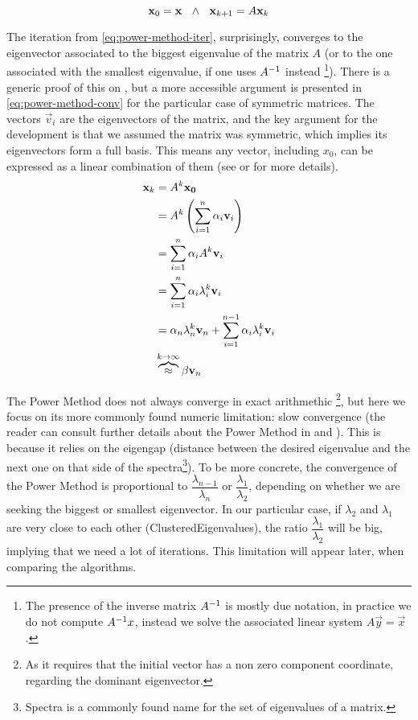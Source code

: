 \begin{equation}
  \label{eq:power-method-iter}
    \vec{x}_0 = \vec{x} \ds{\ds{\land}}
    \vec{x}_{k+1} = A\vec{x}_k  
\end{equation}
\joinbelow{1cm}

The iteration from \cref{eq:power-method-iter}, surprisingly,
converges to the eigenvector 
associated to the biggest eigenvalue of the matrix $A$ (or to the one
associated with the smallest eigenvalue, if one uses ${A}^{-1}$ instead
\footnote{The presence of the inverse matrix ${A}^{-1}$ is mostly due
  notation, in practice we do not compute ${A}^{-1}x$, instead we solve the
  associated linear system $A\vec{y} = \vec{x}$.}). There is a
generic proof of this on \cite{saad92}, but a more accessible argument
is presented in \cref{eq:power-method-conv} for the particular case of
symmetric matrices. The vectors 
$\vec{v}_i$ are the eigenvectors of the matrix, and the key argument
for the development is that we
assumed the  matrix was symmetric, which implies its eigenvectors form a full
basis. This means any vector, including $x_0$, can be expressed as a
linear combination of them (see \cite{strang88} or \cite{golub13} for
more details). \\

\begin{align}
  \begin{split}
  \label{eq:power-method-conv}
  \vec{x}_k &= A^{k}\vec{x_0} \\
  &= A^{k}\left(\sum\limits_{\tiny{i=1}}^{n} \alpha_i\vec{v}_i \right) \\
  &= \sum\limits_{\tiny{i=1}}^{n} \alpha_i A^{k} \vec{v}_i  \\
  &= \sum\limits_{\tiny{i=1}}^{n} \alpha_i \lambda_i^{k} \vec{v}_i \\
  &= \alpha_n \lambda_n^{k} \vec{v}_n +
  \sum\limits_{\tiny{i=1}}^{n-1} \alpha_i \lambda_i^{k} \vec{v}_i \\
  & \overbrace{\approx}^{k \to \infty} \beta \vec{v}_n  
  \end{split}
\end{align}


The Power Method does not always converge in exact
arithmethic \footnote{As it requires that the initial vector has a non
  zero component coordinate, regarding the dominant eigenvector.}, but
here we focus on its 
more commonly found numeric limitation: slow convergence (the reader
can consult further details about the Power Method in \cite{golub13}
and \cite{parlett80}). This is
because it relies on the eigengap (distance between the desired eigenvalue and
the next one on that side of the spectra\footnote{Spectra is a
  commonly found name for the set of eigenvalues of a matrix.}). To be
more concrete, the convergence of the Power Method is proportional to
$\dfrac{\lambda_{n-1}}{\lambda_n}$ or $\dfrac{\lambda_1}{\lambda_2}$,
depending on whether we are seeking the  biggest or smallest
eigenvector. In our particular case, if $\lambda_2$ and $\lambda_1$ are very close to each other (\gls{ClusteredEigenvalues}), the ratio $\dfrac{\lambda_1}{\lambda_2}$ will be big, implying that we need a lot of iterations. This limitation will appear later, when comparing the algorithms.


